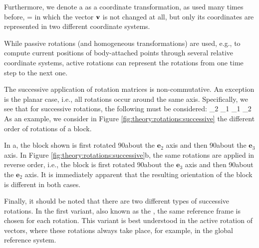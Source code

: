{Furthermore, we denote a  as a coordinate transformation, as used many times before,
\be
   =  
\ee
in which the vector $\mathbf{v}$ is not changed at all, but only its coordinates are represented in two different coordinate systems.

While passive rotations (and homogeneous transformations) are used, e.g., to compute current positions of body-attached points through several relative coordinate systems, active rotations can represent the rotations from one time step to the next one.

%
The successive application of rotation matrices is non-commutative. An exception is the planar case, i.e., all rotations occur around the same axis.
Specifically, we see that for successive rotations, the following must be considered:
\be
  \Am_2 \Am_1 \vv \neq \Am_1 \Am_2 \vv \eqDot
\ee
As an example, we consider in Figure \ref{fig:theory:rotations:successive} the different order of rotations of a block.
%
%

In a, the block shown is first rotated 90\textdegree about the $\mathbf{e}_2$ axis and then 90\textdegree about the $\mathbf{e}_3$ axis. In Figure \ref{fig:theory:rotations:successive}b, the same rotations are applied in reverse order, i.e., the block is first rotated 90\textdegree about the $\mathbf{e}_3$ axis and then 90\textdegree about the $\mathbf{e}_2$ axis. It is immediately apparent that the resulting orientation of the block is different in both cases.
%
%

Finally, it should be noted that there are two different types of successive rotations.
In the first variant, also known as the , the same reference frame is chosen for each rotation. This variant is best understood in the active rotation of vectors, where these rotations always take place, for example, in the global reference system.

}
